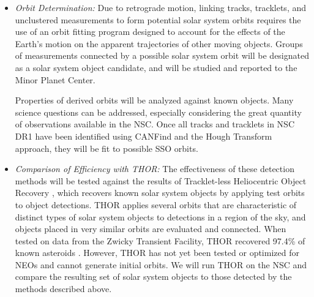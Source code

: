 \documentclass[twocolumn]{aastex62}
\begin{document}
\begin{itemize}
\item \textit{Orbit Determination:}
Due to retrograde motion, linking tracks, tracklets, and unclustered measurements to form potential solar system orbits requires the use of an orbit fitting program designed to account for the effects of the Earth's motion on the apparent trajectories of other moving objects.  %
Groups of measurements connected by a possible solar system orbit will be designated as a solar system object candidate, and will be studied and reported to the Minor Planet Center.

Properties of derived orbits will be analyzed against known objects.  Many science questions can be addressed, especially considering the great quantity of observations available in the NSC.  
Once all tracks and tracklets in NSC DR1 have been identified using CANFind and the Hough Transform approach, they will be fit to possible SSO orbits.  

\item \textit{Comparison of Efficiency with THOR:}
The effectiveness of these detection methods will be tested against the results of Tracklet-less Heliocentric Object Recovery \citep[THOR;][]{Moeyens}, which recovers known solar system objects by applying test orbits to object detections.  THOR applies several orbits that are characteristic of distinct types of solar system objects to detections in a region of the sky, and objects placed in very similar orbits are evaluated and connected.  When tested on data from the Zwicky Transient Facility, THOR recovered 97.4\% of known asteroids \citep{Moeyens}.  However, THOR has not yet been tested or optimized for NEOs and cannot generate initial orbits.  We will run THOR on the NSC and compare the resulting set of solar system objects to those detected by the methods described above.
\end{itemize}
\end{document}
